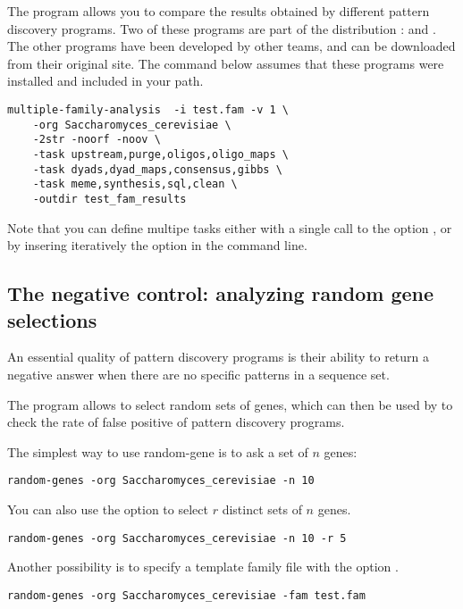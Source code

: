 The program  allows you to compare
the results obtained by different pattern discovery programs. Two of
these programs are part of the \RSAT distribution :
 and . The other
programs have been developed by other teams, and can be downloaded
from their original site. The command below assumes that these
programs were installed and included in your path.

\begin{verbatim}
multiple-family-analysis  -i test.fam -v 1 \
    -org Saccharomyces_cerevisiae \
    -2str -noorf -noov \
    -task upstream,purge,oligos,oligo_maps \
    -task dyads,dyad_maps,consensus,gibbs \
    -task meme,synthesis,sql,clean \
    -outdir test_fam_results
\end{verbatim}

Note that you can define multipe tasks either with a single call to
the option \option{-task}, or by insering iteratively the option in
the command line.

\subsection{The negative control: analyzing random gene selections}

An essential quality of pattern discovery programs is their ability to
 return a negative answer when there are no specific patterns in a
 sequence set.

The program \program{random-genes} allows to select random sets of
 genes, which can then be used by 
 to check the rate of false positive of pattern discovery programs.

The simplest way to use random-gene is to ask a set of $n$ genes:

\begin{verbatim}
random-genes -org Saccharomyces_cerevisiae -n 10
\end{verbatim}

You can also use the option \option{-r} to select $r$ distinct sets of
$n$ genes.

\begin{verbatim}
random-genes -org Saccharomyces_cerevisiae -n 10 -r 5
\end{verbatim}

Another possibility is to specify a template family file with the
 option .

\begin{verbatim}
random-genes -org Saccharomyces_cerevisiae -fam test.fam
\end{verbatim}

